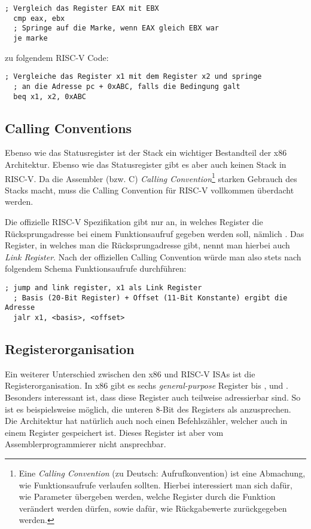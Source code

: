 \begin{lstlisting}[style=x86Assembler]
  ; Vergleich das Register EAX mit EBX
  cmp eax, ebx
  ; Springe auf die Marke, wenn EAX gleich EBX war
  je marke
\end{lstlisting}

zu folgendem RISC-V Code:

\begin{lstlisting}[style=risc-v_Assembler]
  ; Vergleiche das Register x1 mit dem Register x2 und springe
  ; an die Adresse pc + 0xABC, falls die Bedingung galt
  beq x1, x2, 0xABC
\end{lstlisting}

\subsection{Calling Conventions}

Ebenso wie das Statusregister ist der Stack ein wichtiger Bestandteil der x86
Architektur. Ebenso wie das Statusregister gibt es aber auch keinen Stack in
RISC-V. Da die Assembler (bzw. C) \emph{Calling Convention}\footnote{Eine
  \emph{Calling Convention} (zu Deutsch: Aufrufkonvention) ist eine Abmachung, wie Funktionsaufrufe verlaufen
  sollten. Hierbei interessiert man sich dafür, wie Parameter übergeben werden,
  welche Register durch die Funktion verändert werden dürfen, sowie dafür, wie
  Rückgabewerte zurückgegeben werden.} starken Gebrauch des Stacks macht, muss
die Calling Convention für RISC-V vollkommen überdacht werden.

Die offizielle RISC-V Spezifikation gibt nur an, in welches Register die
Rücksprungadresse bei einem Funktionsaufruf gegeben werden soll, nämlich
. Das Register, in welches man die Rücksprungadresse gibt, nennt man
hierbei auch \emph{Link Register}. Nach der offiziellen Calling Convention würde
man also stets nach folgendem Schema Funktionsaufrufe durchführen:

\begin{lstlisting}[style=risc-v_Assembler]
  ; jump and link register, x1 als Link Register
  ; Basis (20-Bit Register) + Offset (11-Bit Konstante) ergibt die Adresse
  jalr x1, <basis>, <offset>
\end{lstlisting}

\subsection{Registerorganisation}

Ein weiterer Unterschied zwischen den x86 und RISC-V ISAs ist die
Registerorganisation. In x86 gibt es sechs \emph{general-purpose} Register
 bis ,  und . Besonders interessant ist,
dass diese Register auch teilweise adressierbar sind. So ist es beispielsweise
möglich, die unteren 8-Bit des Registers  als 
anzusprechen. Die Architektur hat natürlich auch noch einen Befehlszähler,
welcher auch in einem Register gespeichert ist. Dieses Register ist aber vom
Assemblerprogrammierer nicht ansprechbar.

